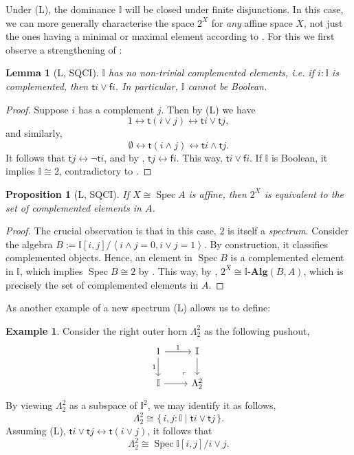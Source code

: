 \documentclass[12pt]{amsart}
\newtheorem{lemma}[theorem]{Lemma}
\newtheorem{proposition}[theorem]{Proposition}
\theoremstyle{definition}
\newtheorem{example}[theorem]{Example}
\newcommand{\mb}[1]{\mathbf{#1}}
\newcommand{\mbb}[1]{\mathbb{#1}}
\newcommand{\I}{\mbb I}
\newcommand{\ms}[1]{\mathsf{#1}}
\newcommand{\alg}{\text{-}\mb{Alg}}
\newcommand{\pair}[1]{\left\langle#1\right\rangle}
\newcommand{\scomp}[2]{\{\,#1\mid#2\,\}}
\newcommand{\emp}{\emptyset}
\newcommand{\eq}{\leftrightarrow}
\newcommand{\spec}{\operatorname{Spec}}
\begin{document}
Under (L), the dominance $\I$ will be closed under finite disjunctions. In this case, we can more generally characterise the space $2^X$ for \emph{any} affine space $X$, not just the ones having a minimal or maximal element according to . For this we first observe a strengthening of :

\begin{lemma}[L, SQCI]\label{lem:intisnotBoolean}
  $\I$ has no non-trivial complemented elements, i.e. if $i : \I$ is complemented, then $\ms ti \vee \ms fi$. In particular, $\I$ cannot be Boolean.
\end{lemma}
\begin{proof}
  Suppose $i$ has a complement $j$. Then by (L) we have
  \[ 1 \eq \ms t(i \vee j) \eq \ms ti \vee \ms tj, \]
  and similarly,
  \[ \emp \eq \ms t(i \wedge j) \eq \ms ti \wedge \ms tj. \]
  It follows that $\ms tj \eq \neg \ms ti$, and by , $\ms tj \eq \ms fi$. This way, $\ms ti \vee \ms fi$. If $\I$ is Boolean, it implies $\I \cong 2$, contradictory to .
\end{proof}

\begin{proposition}[L, SQCI]\label{prop:complementinalgebra}
  If $X \cong \spec A$ is affine, then $2^X$ is equivalent to the set of complemented elements in $A$.
\end{proposition}
\begin{proof}
  The crucial observation is that in this case, $2$ is itself a \emph{spectrum}. Consider the algebra $B := \I[i,j]/\pair{i\wedge j =0,i\vee j = 1}$. By construction, it classifies complemented objects. Hence, an element in $\spec B$ is a complemented element in $\I$, which implies $\spec B \cong 2$ by . This way, by , $2^X \cong \I\alg(B,A)$, which is precisely the set of complemented elements in $A$.
\end{proof}

As another example of a new spectrum (L) allows us to define:

\begin{example}\label{exm:hornaffine}
  Consider the right outer horn $\Lambda^2_2$ as the following pushout,
  \[
    \begin{tikzcd}
      1 \ar[d, "1"'] \ar[r, "1"] & \I \ar[d] \\
      \I \ar[r] & \Lambda^2_2
      \arrow["\lrcorner"{anchor=center, pos=0.125, rotate=180}, draw=none, from=2-2, to=1-1]
    \end{tikzcd}
  \]
  By viewing $\Lambda^2_2$ as a subspace of $\I^2$, we may identify it as follows,
  \[ \Lambda^2_2 \cong \scomp{i,j : \I}{\ms ti \vee \ms tj}. \]
  Assuming (L), $\ms ti \vee \ms tj \eq \ms t(i\vee j)$, it follows that 
  \[ \Lambda^2_2 \cong \spec \I[i,j]/i \vee j. \]
\end{example}
\end{document}
